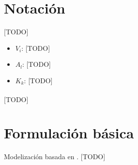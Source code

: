 \documentclass{subfiles}
\begin{document}
    \section{Notación}
    \label{sec:formulation_notation}

      \paragraph{}
      [TODO]

      \begin{itemize}
        \item $V_{i}$: [TODO]
        \item $A_{l}$: [TODO]
        \item $K_{k}$: [TODO]
      \end{itemize}

      \paragraph{}
      [TODO]


    \section{Formulación básica}
    \label{sec:formulation_basic_formulation}

      \paragraph{}
      Modelización basada en \cite{parragh2008survey}. [TODO]
\end{document}
